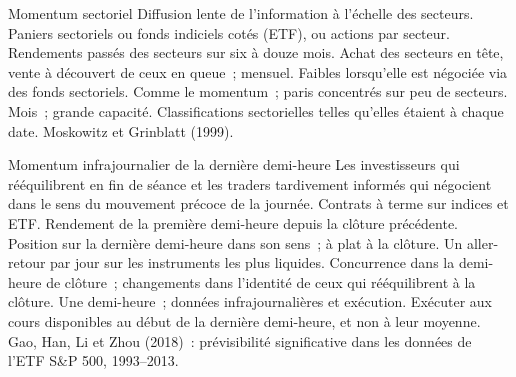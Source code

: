 \begin{strategyfile}{Momentum sectoriel}\label{strat:s1:momentum:industry}
 Diffusion lente de l'information à l'échelle des secteurs.
 Paniers sectoriels ou fonds indiciels cotés (ETF), ou actions par secteur.
 Rendements passés des secteurs sur six à douze mois.
 Achat des secteurs en tête, vente à découvert de ceux en queue~; mensuel.
 Faibles lorsqu'elle est négociée via des fonds sectoriels.
 Comme le momentum~; paris concentrés sur peu de secteurs.
 Mois~; grande capacité.
 Classifications sectorielles telles qu'elles étaient à chaque date.
 Moskowitz et Grinblatt (1999).
\end{strategyfile}

\begin{strategyfile}{Momentum infrajournalier de la dernière demi-heure}\label{strat:s1:momentum:intraday}
 Les investisseurs qui rééquilibrent en fin de séance et les traders tardivement informés qui négocient dans le sens du mouvement précoce de la journée.
 Contrats à terme sur indices et ETF.
 Rendement de la première demi-heure depuis la clôture précédente.
 Position sur la dernière demi-heure dans son sens~; à plat à la clôture.
 Un aller-retour par jour sur les instruments les plus liquides.
 Concurrence dans la demi-heure de clôture~; changements dans l'identité de ceux qui rééquilibrent à la clôture.
 Une demi-heure~; données infrajournalières et exécution.
 Exécuter aux cours disponibles au début de la dernière demi-heure, et non à leur moyenne.
 Gao, Han, Li et Zhou (2018)~: prévisibilité significative dans les données de l'ETF S\&P 500, 1993--2013.
\end{strategyfile}

